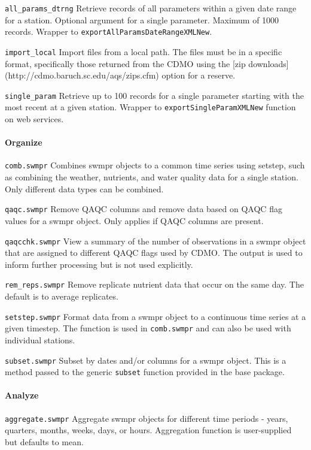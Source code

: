 \documentclass[10pt,letterpaper]{article}\usepackage[]{graphicx}\usepackage[]{color}
\begin{document}
\texttt{all\_params\_dtrng} Retrieve records of all parameters within a given date range for a station.  Optional argument for a single parameter.  Maximum of 1000 records. Wrapper to \texttt{exportAllParamsDateRangeXMLNew}.

\texttt{import\_local} Import files from a local path.  The files must be in a specific format, specifically those returned from the CDMO using the [zip downloads](http://cdmo.baruch.sc.edu/aqs/zips.cfm) option for a reserve.

\texttt{single\_param} Retrieve up to 100 records for a single parameter starting with the most recent at a given station.  Wrapper to \texttt{exportSingleParamXMLNew} function on web services. 

\paragraph{Organize}

\texttt{comb.swmpr} Combines swmpr objects to a common time series using setstep, such as combining the weather, nutrients, and water quality data for a single station. Only different data types can be combined.

\texttt{qaqc.swmpr} Remove QAQC columns and remove data based on QAQC flag values for a swmpr object.  Only applies if QAQC columns are present.  

\texttt{qaqcchk.swmpr} View a summary of the number of observations in a swmpr object that are assigned to different QAQC flags used by CDMO.  The output is used to inform further processing but is not used explicitly. 

\texttt{rem\_reps.swmpr} Remove replicate nutrient data that occur on the same day.  The default is to average replicates.

\texttt{setstep.swmpr} Format data from a swmpr object to a continuous time series at a given timestep.  The function is used in \texttt{comb.swmpr} and can also be used with individual stations.

\texttt{subset.swmpr} Subset by dates and/or columns for a swmpr object.  This is a method passed to the generic \texttt{subset} function provided in the base package.

\paragraph{Analyze}

\texttt{aggregate.swmpr} Aggregate swmpr objects for different time periods - years, quarters, months,  weeks, days, or hours.  Aggregation function is user-supplied but defaults to mean. 
\end{document}
